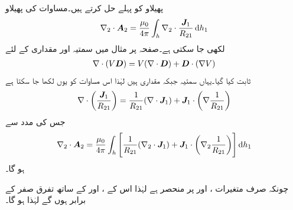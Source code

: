 پھیلاو کو پہلے حل کرتے ہیں۔مساوات  کی پھیلاو
\begin{align}
\nabla_2 \cdot \kvec{A}_2=\frac{\mu_0}{4\pi}\int_h \nabla_2 \cdot \frac{\kvec{J}_1}{R_{21}} \dif h_1
\end{align}
لکھی جا سکتی ہے۔صفحہ  پر مثال  میں سمتیہ  اور مقداری  کے لئے
\begin{align*}
\nabla \cdot  (V {{\boldsymbol{D}}})=V (\nabla \cdot {\ensuremath{{\boldsymbol{D}}}})+{{\boldsymbol{D}}} \cdot (\nabla V)
\end{align*}
ثابت کیا گیا۔یہاں سمتیہ  جبکہ مقداری  ہیں لہٰذا اس مساوات کو یوں لکھا جا سکتا ہے
\begin{align}\label{مساوات_مقناطیسی_سمتیہ_اور_مقداری_کے_حاصل_ضرب_کی_گردش_ب}
\nabla \cdot  \left(\frac{ {{\boldsymbol{J}}}_1}{R_{21}}\right)=\frac{1}{R_{21}} (\nabla \cdot {\ensuremath{{\boldsymbol{J}}}}_1)+{{\boldsymbol{J}}}_1 \cdot \left(\nabla \frac{1}{R_{21}}\right)
\end{align}
 جس کی مدد سے
\begin{align}
\nabla_2 \cdot \kvec{A}_2=\frac{\mu_0}{4\pi}\int_h \left[\frac{1}{R_{21}} (\nabla_2 \cdot \kvec{J}_1)+\kvec{J}_1 \cdot \left(\nabla_2 \frac{1}{R_{21}}\right)\right] \dif h_1
\end{align}
ہو گا۔

چونکہ  صرف متغیرات ،  اور  پر منحصر ہے لہٰذا اس کے ،  اور  کے ساتھ تفرق صفر کے برابر ہوں گے لہٰذا  ہو گا۔

